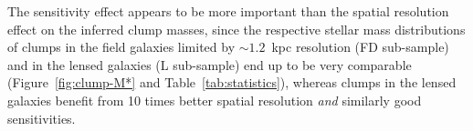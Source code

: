 \documentclass[twocolumn]{aastex61}
\begin{document}
The sensitivity effect appears to be more important than the spatial resolution 
effect on the inferred clump masses, 
since the respective stellar mass distributions of clumps in the
\citet{elmegreen13} field galaxies limited by $\sim 1.2$~kpc resolution 
(FD sub-sample) and in the lensed galaxies (L sub-sample) end up to be very 
comparable
(Figure~\ref{fig:clump-M*} and Table~\ref{tab:statistics}), whereas clumps in 
the lensed galaxies benefit from 10 times better spatial resolution {\it and} 
similarly good sensitivities.
\end{document}
